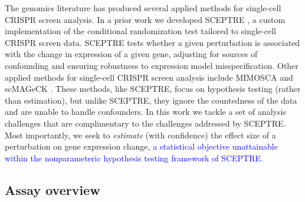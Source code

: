 \documentclass[12pt]{article}
\newcommand{\blue}[1]{\textcolor{blue}{#1}}
\begin{document}
The genomics literature has produced several applied methods for single-cell CRISPR screen analysis. In a prior work we developed SCEPTRE \cite{Barry2020}, a custom implementation of the conditional randomization test \cite{Candes2018, Liu2021} tailored to single-cell CRISPR screen data. SCEPTRE tests whether a given perturbation is associated with the change in expression of a given gene, adjusting for sources of confounding and ensuring robustness to expression model misspecification. Other applied methods for single-cell CRISPR screen analysis include MIMOSCA \cite{Dixit2016} and scMAGeCK \cite{Yang2019}. These methods, like SCEPTRE, focus on hypothesis testing (rather than estimation), but unlike SCEPTRE, they ignore the countedness of the data and are unable to handle confounders. In this work we tackle a set of analysis challenges that are complimentary to the challenges addressed by SCEPTRE. Most importantly, we seek to \textit{estimate} (with confidence) the effect size of a perturbation on gene expression change, \blue{a statistical objective unattainable within the nonparameteric hypothesis testing framework of SCEPTRE.}

\subsection{Assay overview}
\end{document}
